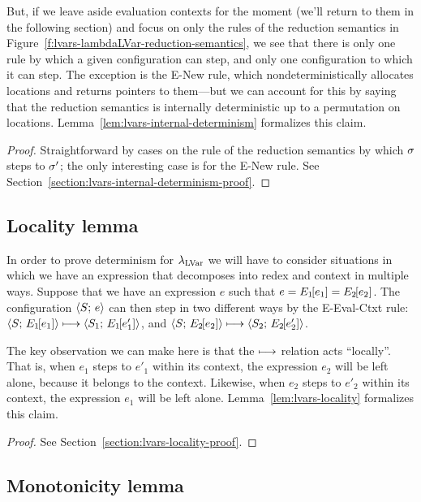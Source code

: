 But, if we leave aside evaluation contexts for the moment (we'll
return to them in the following section) and focus on only the rules
of the reduction semantics in
Figure~\ref{f:lvars-lambdaLVar-reduction-semantics}, we see that there
is only one rule by which a given configuration can step, and only one
configuration to which it can step.  The exception is the {\sc E-New}
rule, which nondeterministically allocates locations and returns
pointers to them---but we can account for this by saying that the
reduction semantics is internally deterministic up to a permutation on
locations.  Lemma~\ref{lem:lvars-internal-determinism} formalizes this
claim.

\LVarsLemInternalDeterminism
\begin{proof}
  Straightforward by cases on the rule of the reduction semantics by
  which $\sigma$ steps to $\sigma'$; the only interesting case is for
  the {\sc E-New} rule.  See
  Section~\ref{section:lvars-internal-determinism-proof}.
\end{proof}

\subsection{Locality lemma}

In order to prove determinism for $\lambda_{\textrm{LVar}}$ we will have to
consider situations in which we have an expression that decomposes
into redex and context in multiple ways.  Suppose that we have an
expression $e$ such that $e = E_1\hspace{-1mm}\left[e_1\right] =
E_2\hspace{-1mm}\left[e_2\right]$.  The configuration $\langle S;\, e \rangle$ can then step
in two different ways by the {\sc E-Eval-Ctxt} rule:
$\langle S;\, E_1\hspace{-1mm}\left[e_1\right] \rangle \longmapsto
\langle S_1;\, E_1\hspace{-1mm}\left[e'_1\right] \rangle$, and
$\langle S;\, E_2\hspace{-1mm}\left[e_2\right] \rangle \longmapsto
\langle S_2;\, E_2\hspace{-1mm}\left[e'_2\right] \rangle$.

The key observation we can make here is that the $\longmapsto$
relation acts ``locally''.  That is, when $e_1$ steps to $e'_1$ within
its context, the expression $e_2$ will be left alone, because it
belongs to the context.  Likewise, when $e_2$ steps to $e'_2$ within
its context, the expression $e_1$ will be left alone.
Lemma~\ref{lem:lvars-locality} formalizes this claim.

\LVarsLemLocality
\begin{proof}
   See
  Section~\ref{section:lvars-locality-proof}.
\end{proof}

\subsection{Monotonicity lemma}

